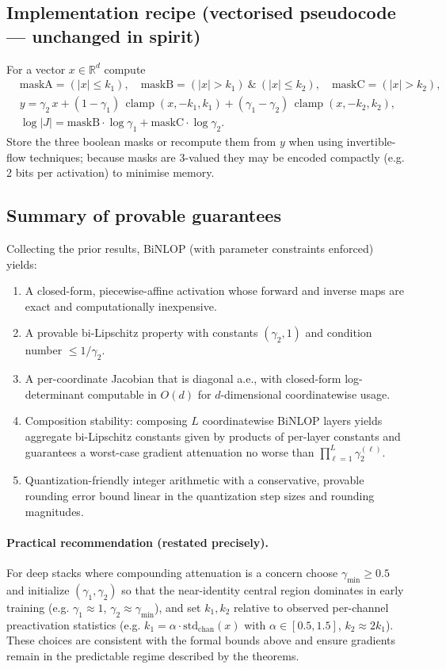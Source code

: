 \documentclass[11pt, twoside, openright, english]{article}
\DeclareMathOperator{\clamp}{clamp}
\newcommand{\R}{\mathbb{R}}
\numberwithin{equation}{section}
\theoremstyle{plain}
\theoremstyle{definition}
\theoremstyle{remark}
\begin{document}
\subsection{Implementation recipe (vectorised pseudocode — unchanged in spirit)}
For a vector $x\in\R^d$ compute
\[
\begin{aligned}
&\text{maskA} = (|x|\le k_1),\quad
\text{maskB} = (|x|> k_1)\ \&\ (|x|\le k_2),\quad
\text{maskC} = (|x|> k_2),\\[4pt]
&y = \gamma_2\,x + (1-\gamma_1)\,\clamp(x,-k_1,k_1) + (\gamma_1-\gamma_2)\,\clamp(x,-k_2,k_2),\\[4pt]
&\log|J| = \text{maskB}\cdot\log\gamma_1 + \text{maskC}\cdot\log\gamma_2.
\end{aligned}
\]
Store the three boolean masks or recompute them from $y$ when using invertible-flow techniques; because masks are 3-valued they may be encoded compactly (e.g. 2 bits per activation) to minimise memory.

\subsection{Summary of provable guarantees}
Collecting the prior results, BiNLOP (with parameter constraints enforced) yields:
\begin{enumerate}
  \item A closed-form, piecewise-affine activation whose forward and inverse maps are exact and computationally inexpensive.
  \item A provable bi-Lipschitz property with constants $(\gamma_2,1)$ and condition number $\le 1/\gamma_2$.
  \item A per-coordinate Jacobian that is diagonal a.e., with closed-form log-determinant computable in $O(d)$ for $d$-dimensional coordinatewise usage.
  \item Composition stability: composing $L$ coordinatewise BiNLOP layers yields aggregate bi-Lipschitz constants given by products of per-layer constants and guarantees a worst-case gradient attenuation no worse than $\prod_{\ell=1}^L \gamma_2^{(\ell)}$.
  \item Quantization-friendly integer arithmetic with a conservative, provable rounding error bound linear in the quantization step sizes and rounding magnitudes.
\end{enumerate}

\paragraph{Practical recommendation (restated precisely).} For deep stacks where compounding attenuation is a concern choose $\gamma_{\min}\ge 0.5$ and initialize $(\gamma_1,\gamma_2)$ so that the near-identity central region dominates in early training (e.g. $\gamma_1\approx 1$, $\gamma_2\approx\gamma_{\min}$), and set $k_1,k_2$ relative to observed per-channel preactivation statistics (e.g. $k_1=\alpha\cdot\mathrm{std}_{\mathrm{chan}}(x)$ with $\alpha\in[0.5,1.5]$, $k_2\approx 2k_1$). These choices are consistent with the formal bounds above and ensure gradients remain in the predictable regime described by the theorems.
\end{document}
